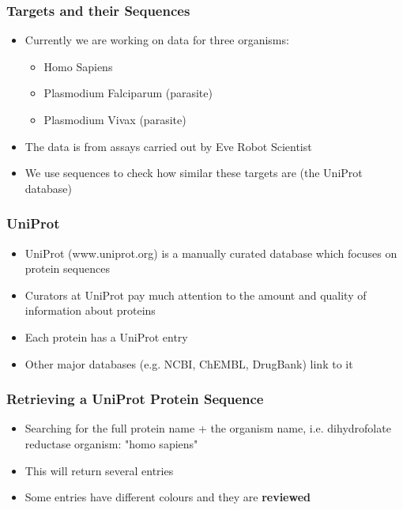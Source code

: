 \documentclass[compress]{beamer}
\begin{document}
\begin{frame}
\frametitle{Targets and their Sequences} 
\begin{itemize}%
 \item Currently we are working on data for three organisms:
 \begin{itemize}%
   \item Homo Sapiens
   \item Plasmodium Falciparum (parasite)
   \item Plasmodium Vivax (parasite)
 \end{itemize}
  
  \item The data is from assays carried out by Eve Robot Scientist

 \item We use sequences to check how similar these targets are (the UniProt database)
 \end{itemize}
\end{frame}

\begin{frame}
\frametitle{UniProt} 
\begin{itemize}%
 \item UniProt (www.uniprot.org) is a manually curated database which focuses on protein sequences
 \item Curators at UniProt pay much attention to the amount and quality of information about proteins
 \item Each protein has a UniProt entry
 \item Other major databases (e.g. NCBI, ChEMBL, DrugBank) link to it
 
 \end{itemize}
\end{frame}


\begin{frame}
\frametitle{Retrieving a UniProt Protein Sequence} 
\begin{itemize}%
 \item Searching for the full protein name + the organism name, i.e. dihydrofolate reductase organism: "homo sapiens"
 \item This will return several entries
 \item Some entries have different colours and they are \textbf{reviewed}
 
 \end{itemize}
\end{frame}
\end{document}
